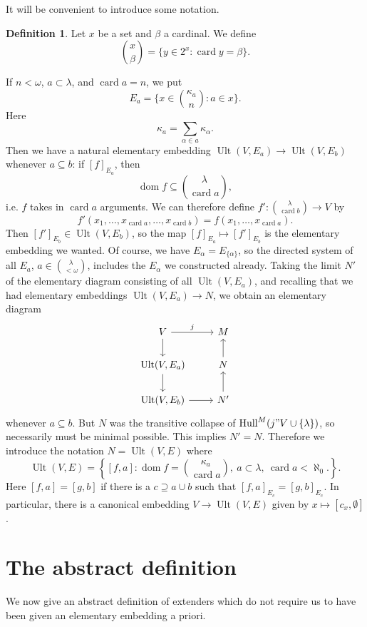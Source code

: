 \documentclass[12pt]{report}
\newcommand{\card}{\operatorname{card}}
\DeclareMathOperator{\Hull}{Hull}
\DeclareMathOperator{\dom}{dom}
\DeclareMathOperator{\Ult}{Ult}
\theoremstyle{definition}
\newtheorem{definition}[theorem]{Definition}
\begin{document}
It will be convenient to introduce some notation.
\begin{definition}
Let $x$ be a set and $\beta$ a cardinal. We define
$$\binom x\beta = \{y \in 2^x: \card y = \beta\}.$$
\end{definition}
If $n < \omega$, $a \subset \lambda$, and $\card a = n$, we put
$$E_a = \{x \in \binom{\kappa_a}{n}: a \in x\}.$$
Here
$$\kappa_a = \sum_{\alpha \in a} \kappa_\alpha.$$
Then we have a natural elementary embedding $\Ult(V, E_a) \to \Ult(V, E_b)$ whenever $a \subseteq b$:
if $[f]_{E_a}$, then
$$\dom f \subseteq \binom{\lambda}{\card a},$$
i.e. $f$ takes in $\card a$ arguments. We can therefore define $f': \binom{\lambda}{\card b} \to V$ by
$$f'(x_1, \dots, x_{\card a}, \dots, x_{\card b}) = f(x_1, \dots, x_{\card a}).$$
Then $[f']_{E_b} \in \Ult(V, E_b)$, so the map $[f]_{E_a} \mapsto [f']_{E_b}$ is the elementary embedding we wanted.
Of course, we have $E_\alpha = E_{\{\alpha\}}$, so the directed system of all $E_a$, $a \in \binom{\lambda}{<\omega}$, includes the $E_\alpha$ we constructed already.
Taking the limit $N'$ of the elementary diagram consisting of all $\Ult(V, E_a)$, and recalling that we had elementary embeddings $\Ult(V, E_a) \to N$, we obtain an elementary diagram
$$\begin{tikzcd}
V \arrow[r,"j"] \arrow[d] & M\\
\Ult(V, E_a) \arrow[d] & N \arrow[u] \\
\Ult(V, E_b) \arrow[r] & N' \arrow[u]
\end{tikzcd}$$
whenever $a \subseteq b$. But $N$ was the transitive collapse of $\Hull^M(j"V \cup \{\lambda\})$, so necessarily must be minimal possible. This implies $N' = N$.
Therefore we introduce the notation $N = \Ult(V, E)$ where
$$\Ult(V, E) = \left\{[f, a]: \dom f = \binom{\kappa_a}{\card a}, ~a \subset \lambda, ~\card a < \aleph_0.\right\}.$$
Here $[f, a] = [g, b]$ if there is a $c \supseteq a \cup b$ such that $[f, a]_{E_c} = [g, b]_{E_c}$.
In particular, there is a canonical embedding $V \to \Ult(V, E)$ given by $x \mapsto [c_x, \emptyset]$.

\section{The abstract definition}
We now give an abstract definition of extenders which do not require us to have been given an elementary embedding a priori.
\end{document}
